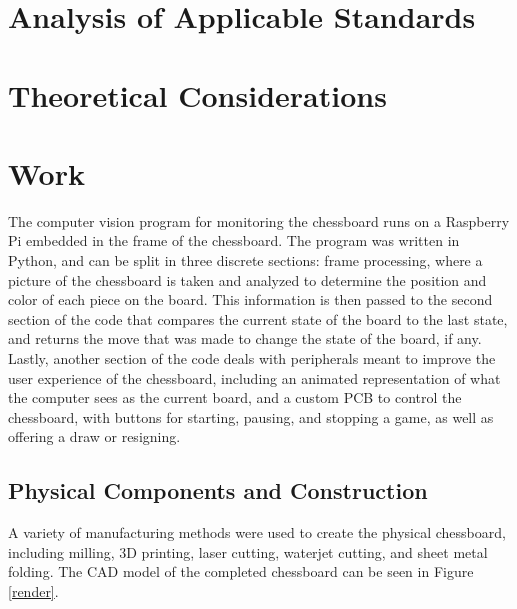 \documentclass[journal]{IEEEtran}
\begin{document}
\section{Analysis of Applicable Standards}

\section{Theoretical Considerations}

\section{Work}

The computer vision program for monitoring the chessboard runs on a Raspberry Pi embedded in the frame of the chessboard. The program was written in Python, and can be split in three discrete sections: frame processing, where a picture of the chessboard is taken and analyzed to determine the position and color of each piece on the board. This information is then passed to the second section of the code that compares the current state of the board to the last state, and returns the move that was made to change the state of the board, if any. Lastly, another section of the code deals with peripherals meant to improve the user experience of the chessboard, including an animated representation of what the computer sees as the current board, and a custom PCB to control the chessboard, with buttons for starting, pausing, and stopping a game, as well as offering a draw or resigning.

\subsection{Physical Components and Construction}
A variety of manufacturing methods were used to create the physical chessboard, including milling, 3D printing, laser cutting, waterjet cutting, and sheet metal folding. The CAD model of the completed chessboard can be seen in Figure \ref{render}.
\end{document}
